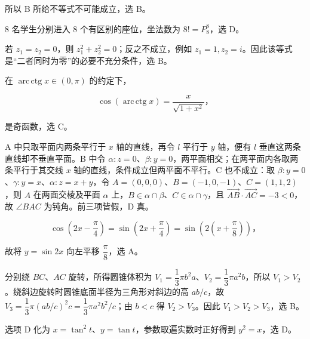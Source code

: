 \begin{answer}
所以 B 所给不等式不可能成立，选 B。


8 名学生分别进入 8 个有区别的座位，坐法数为 $8!=P_8^8$，选 D。


若 $z_1=z_2=0$，则 $z_1^2+z_2^2=0$；反之不成立，例如 $z_1=1,z_2=i$。因此该等式是“二者同时为零”的必要不充分条件，选 B。


在 $\operatorname{arc\,ctg}x\in(0,\pi)$ 的约定下，

\nopagebreak[4]
\[
\cos(\operatorname{arc\,ctg}x)=\frac{x}{\sqrt{1+x^2}}\text{，}
\]

是奇函数，选 C。


A 中只取平面内两条平行于 $x$ 轴的直线，再令 $l$ 平行于 $y$ 轴，便有 $l$ 垂直这两条直线却不垂直平面。B 中令 $\alpha:z=0$、$\beta:y=0$，两平面相交；在两平面内各取两条平行于其交线 $x$ 轴的直线，条件成立但两平面不平行。C 也不成立：取 $\beta:y=0$、$\gamma:y=x$、$\alpha:z=x+y$，令 $A=(0,0,0)$、$B=(-1,0,-1)$、$C=(1,1,2)$，则 $A$ 在两面交棱及平面 $\alpha$ 上，$B\in\alpha\cap\beta$、$C\in\alpha\cap\gamma$，且 $\overrightarrow{AB}\cdot\overrightarrow{AC}=-3<0$，故 $\angle BAC$ 为钝角。前三项皆假，D 真。


\nopagebreak[4]
\[
\cos\left(2x-\frac\pi4\right)=\sin\left(2x+\frac\pi4\right)
=\sin\left(2\left(x+\frac\pi8\right)\right)\text{，}
\]

故将 $y=\sin2x$ 向左平移 $\dfrac\pi8$，选 A。


分别绕 $BC$、$AC$ 旋转，所得圆锥体积为 $V_1=\dfrac13\pi b^2a$、$V_2=\dfrac13\pi a^2b$，所以 $V_1>V_2$。绕斜边旋转时圆锥底面半径为三角形对斜边的高 $ab/c$，故 $V_3=\dfrac13\pi (ab/c)^2c=\dfrac13\pi a^2b^2/c$；由 $b<c$ 得 $V_2>V_3$。因此 $V_1>V_2>V_3$，选 B。


选项 D 化为 $x=\tan^2t$、$y=\tan t$，参数取遍实数时正好得到 $y^2=x$，选 D。











\end{answer}
